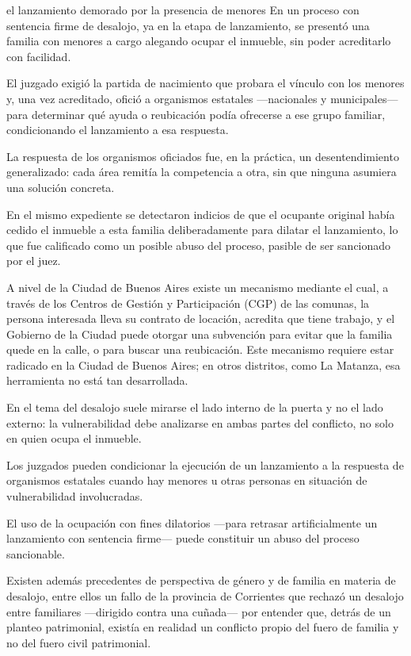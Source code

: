 \documentclass[12pt,oneside]{book}
\begin{document}
\begin{example}{el lanzamiento demorado por la presencia de menores}
En un proceso con sentencia firme de desalojo, ya en la etapa de lanzamiento, se presentó una familia con menores a cargo alegando ocupar el inmueble, sin poder acreditarlo con facilidad.

El juzgado exigió la partida de nacimiento que probara el vínculo con los menores y, una vez acreditado, ofició a organismos estatales ---nacionales y municipales--- para determinar qué ayuda o reubicación podía ofrecerse a ese grupo familiar, condicionando el lanzamiento a esa respuesta.

La respuesta de los organismos oficiados fue, en la práctica, un desentendimiento generalizado: cada área remitía la competencia a otra, sin que ninguna asumiera una solución concreta.

En el mismo expediente se detectaron indicios de que el ocupante original había cedido el inmueble a esta familia deliberadamente para dilatar el lanzamiento, lo que fue calificado como un posible abuso del proceso, pasible de ser sancionado por el juez.
\end{example}

A nivel de la Ciudad de Buenos Aires existe un mecanismo mediante el cual, a través de los Centros de Gestión y Participación (CGP) de las comunas, la persona interesada lleva su contrato de locación, acredita que tiene trabajo, y el Gobierno de la Ciudad puede otorgar una subvención para evitar que la familia quede en la calle, o para buscar una reubicación. Este mecanismo requiere estar radicado en la Ciudad de Buenos Aires; en otros distritos, como La Matanza, esa herramienta no está tan desarrollada.

\begin{important}
En el tema del desalojo suele mirarse el lado interno de la puerta y no el lado externo: la vulnerabilidad debe analizarse en ambas partes del conflicto, no solo en quien ocupa el inmueble.

Los juzgados pueden condicionar la ejecución de un lanzamiento a la respuesta de organismos estatales cuando hay menores u otras personas en situación de vulnerabilidad involucradas.

El uso de la ocupación con fines dilatorios ---para retrasar artificialmente un lanzamiento con sentencia firme--- puede constituir un abuso del proceso sancionable.
\end{important}

Existen además precedentes de perspectiva de género y de familia en materia de desalojo, entre ellos un fallo de la provincia de Corrientes que rechazó un desalojo entre familiares ---dirigido contra una cuñada--- por entender que, detrás de un planteo patrimonial, existía en realidad un conflicto propio del fuero de familia y no del fuero civil patrimonial.
\end{document}
